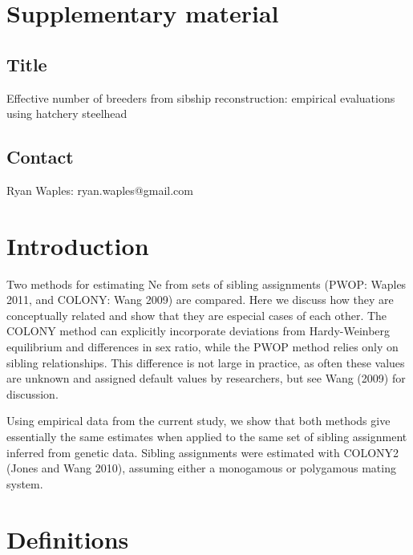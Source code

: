 \documentclass{article}
\begin{document}
\section*{Supplementary material}
\subsection*{Title}
Effective number of breeders from sibship reconstruction: empirical evaluations using hatchery steelhead

\subsection*{Contact}
Ryan Waples:   ryan.waples@gmail.com

\section*{Introduction}
Two methods for estimating Ne from sets of sibling assignments (PWOP: Waples 2011, and COLONY: Wang 2009) are compared.  Here we discuss how they are conceptually related and show that they are especial cases of each other.  The COLONY method can explicitly incorporate deviations from Hardy-Weinberg equilibrium and differences in sex ratio, while the PWOP method relies only on sibling relationships.  This difference is not large in practice, as often these values are unknown and assigned default values by researchers, but see Wang (2009) for discussion.


Using empirical data from the current study, we show that both methods give essentially the same estimates when applied to the same set of sibling assignment inferred from genetic data.  Sibling assignments were estimated with COLONY2 (Jones and Wang 2010), assuming either a monogamous or polygamous mating system.


\section*{Definitions}
\end{document}
